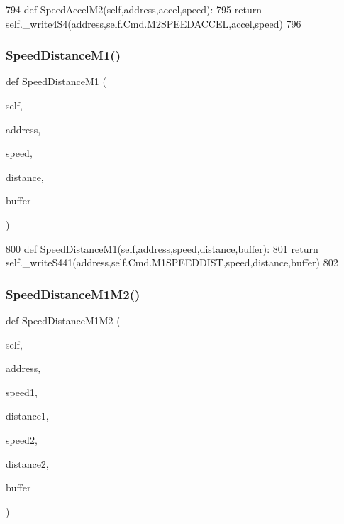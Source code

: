 \begin{DoxyCode}
794     \textcolor{keyword}{def }SpeedAccelM2(self,address,accel,speed):
795         \textcolor{keywordflow}{return} self.\_write4S4(address,self.Cmd.M2SPEEDACCEL,accel,speed)
796 
\end{DoxyCode}
\mbox{\label{classtoxic__hardware_1_1roboclaw__3_1_1Roboclaw_a6664490ee5bec1b0c496b148c9b3f4c7}} 
\subsubsection{\texorpdfstring{Speed\+Distance\+M1()}{SpeedDistanceM1()}}
{\footnotesize\ttfamily def Speed\+Distance\+M1 (\begin{DoxyParamCaption}\item[{}]{self,  }\item[{}]{address,  }\item[{}]{speed,  }\item[{}]{distance,  }\item[{}]{buffer }\end{DoxyParamCaption})}


\begin{DoxyCode}
800     \textcolor{keyword}{def }SpeedDistanceM1(self,address,speed,distance,buffer):
801         \textcolor{keywordflow}{return} self.\_writeS441(address,self.Cmd.M1SPEEDDIST,speed,distance,buffer)
802 
\end{DoxyCode}
\mbox{\label{classtoxic__hardware_1_1roboclaw__3_1_1Roboclaw_ac0664ea79d863b5f153a7a3dac18222d}} 
\subsubsection{\texorpdfstring{Speed\+Distance\+M1\+M2()}{SpeedDistanceM1M2()}}
{\footnotesize\ttfamily def Speed\+Distance\+M1\+M2 (\begin{DoxyParamCaption}\item[{}]{self,  }\item[{}]{address,  }\item[{}]{speed1,  }\item[{}]{distance1,  }\item[{}]{speed2,  }\item[{}]{distance2,  }\item[{}]{buffer }\end{DoxyParamCaption})}


